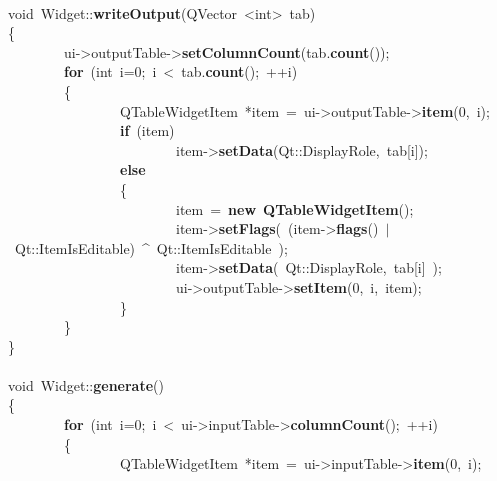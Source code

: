 \mbox{} \\
\mbox{}void\ Widget::\textbf{writeOutput}(QVector\ \textless{}int\textgreater{}\ tab) \\
\mbox{}\{ \\
\mbox{}\ \ \ \ \ \ \ \ ui-\textgreater{}outputTable-\textgreater{}\textbf{setColumnCount}(tab.\textbf{count}()); \\
\mbox{}\ \ \ \ \ \ \ \ \textbf{for}\ (int\ i=0;\ i\ \textless{}\ tab.\textbf{count}();\ ++i) \\
\mbox{}\ \ \ \ \ \ \ \ \{ \\
\mbox{}\ \ \ \ \ \ \ \ \ \ \ \ \ \ \ \ QTableWidgetItem\ *item\ =\ ui-\textgreater{}outputTable-\textgreater{}\textbf{item}(0,\ i); \\
\mbox{}\ \ \ \ \ \ \ \ \ \ \ \ \ \ \ \ \textbf{if}\ (item) \\
\mbox{}\ \ \ \ \ \ \ \ \ \ \ \ \ \ \ \ \ \ \ \ \ \ \ \ item-\textgreater{}\textbf{setData}(Qt::DisplayRole,\ tab[i]); \\
\mbox{}\ \ \ \ \ \ \ \ \ \ \ \ \ \ \ \ \textbf{else} \\
\mbox{}\ \ \ \ \ \ \ \ \ \ \ \ \ \ \ \ \{ \\
\mbox{}\ \ \ \ \ \ \ \ \ \ \ \ \ \ \ \ \ \ \ \ \ \ \ \ item\ =\ \textbf{new}\ \textbf{QTableWidgetItem}(); \\
\mbox{}\ \ \ \ \ \ \ \ \ \ \ \ \ \ \ \ \ \ \ \ \ \ \ \ item-\textgreater{}\textbf{setFlags}(\ (item-\textgreater{}\textbf{flags}()\ $|$\ Qt::ItemIsEditable)\ \textasciicircum{}\ Qt::ItemIsEditable\ ); \\
\mbox{}\ \ \ \ \ \ \ \ \ \ \ \ \ \ \ \ \ \ \ \ \ \ \ \ item-\textgreater{}\textbf{setData}(\ Qt::DisplayRole,\ tab[i]\ ); \\
\mbox{}\ \ \ \ \ \ \ \ \ \ \ \ \ \ \ \ \ \ \ \ \ \ \ \ ui-\textgreater{}outputTable-\textgreater{}\textbf{setItem}(0,\ i,\ item); \\
\mbox{}\ \ \ \ \ \ \ \ \ \ \ \ \ \ \ \ \} \\
\mbox{}\ \ \ \ \ \ \ \ \} \\
\mbox{}\} \\
\mbox{} \\
\mbox{}void\ Widget::\textbf{generate}() \\
\mbox{}\{ \\
\mbox{}\ \ \ \ \ \ \ \ \textbf{for}\ (int\ i=0;\ i\ \textless{}\ ui-\textgreater{}inputTable-\textgreater{}\textbf{columnCount}();\ ++i) \\
\mbox{}\ \ \ \ \ \ \ \ \{ \\
\mbox{}\ \ \ \ \ \ \ \ \ \ \ \ \ \ \ \ QTableWidgetItem\ *item\ =\ ui-\textgreater{}inputTable-\textgreater{}\textbf{item}(0,\ i); \\

